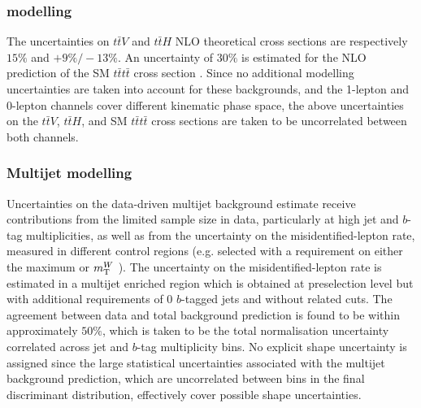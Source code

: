 \subsubsection[$tt$+$X$, $X=V$, $H$, $t\bar{t}$ modelling]{ modelling}
The uncertainties on $t\bar{t}V$ and $t\bar{t}H$ NLO theoretical cross sections \cite{ttbarVxs1,ttbarVxs2,lhcxs} are respectively $15\%$ and $+9\%/-13\%$. An uncertainty of $30\%$ is estimated for the NLO prediction of the SM $t\bar{t}t\bar{t}$ cross section \cite{Alwall:2014hca}. Since no additional modelling uncertainties are taken into account for these backgrounds, and the 1-lepton and 0-lepton channels cover different kinematic phase space, the above uncertainties on the $t\bar{t}V$, $t\bar{t}H$, and SM $t\bar{t}t\bar{t}$ cross sections are taken to be uncorrelated between both channels.


\subsubsection{Multijet modelling}

Uncertainties on the data-driven multijet background estimate receive contributions from the limited sample size in data, particularly at high jet and $b$-tag multiplicities, as well as from the uncertainty on the misidentified-lepton rate, measured in different control regions (e.g. selected with a requirement on either
the maximum \MET or $m_{\rm T}^{W}$ ). The uncertainty on the misidentified-lepton rate is estimated in a multijet enriched region which is obtained at  preselection level but with additional requirements of 0 $b$-tagged jets and without \MET related cuts. The agreement between data and total background prediction is found to be within approximately $50\%$, which is taken to be the total normalisation uncertainty correlated across jet and $b$-tag multiplicity bins. No explicit shape uncertainty is assigned since the large statistical uncertainties associated with the multijet background prediction, which are uncorrelated between bins in the final discriminant distribution, effectively cover possible shape uncertainties.

